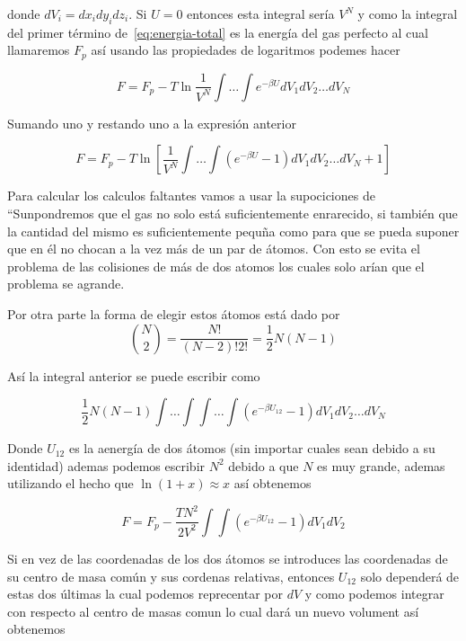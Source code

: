 donde $dV_i = dx_i dy_i dz_i$. Si $U = 0$ entonces esta integral sería
$V^N$ y como la integral del primer término de~\ref{eq:energia-total}
es la energía del gas perfecto al cual llamaremos $F_p$ así
usando las propiedades de logaritmos podemes hacer

\begin{equation}
    F = F_p - T \ln \frac{1}{V^N} \int\ldots\int e^{-\beta U} dV_1dV_2 \ldots dV_N
\end{equation}

Sumando uno y restando uno a la expresión anterior

\begin{equation}
    F = F_p - T \ln  \left[\frac{1}{V^N} \int\ldots\int \left(e^{-\beta U}  - 1\right)dV_1dV_2 \ldots dV_N + 1\right]
\end{equation}

Para calcular los calculos faltantes vamos a usar la supociciones de
\parencite[p.~262]{landau} ``Sunpondremos que el gas no solo está suficientemente
enrarecido, si también que la cantidad del mismo es suficientemente pequña 
como para que se pueda suponer que en él no chocan a la vez más de un par de átomos.
Con esto se evita el problema de las colisiones de más de dos atomos los cuales solo
arían que el problema se agrande.

Por otra  parte la forma de elegir estos átomos está dado por
\begin{equation}
    \binom{N}{2} = \frac{N!}{(N - 2)! 2!} = \frac{1}{2}N(N - 1)
\end{equation}

Así la integral anterior se puede escribir como

\begin{equation}
    \frac{1}{2}N(N - 1)
    \int\ldots\int \int\ldots\int \left(e^{-\beta U_{12}}  - 1\right)dV_1dV_2 \ldots dV_N
\end{equation}

Donde $U_{12}$ es la aenergía de dos átomos (sin importar cuales sean debido
a su identidad) ademas podemos escribir $N^2$ debido a que $N$ es muy grande,
ademas utilizando el hecho que $\ln(1 + x) \approx x$
así obtenemos

\begin{equation}
    F = F_p - \frac{TN^2}{2V^2}\int\int(e^{-\beta U_{12}} - 1) dV_1 dV_2
\end{equation}

Si en vez de las coordenadas de los dos átomos se introduces las coordenadas
de su centro de masa común y sus cordenas relativas, entonces
$U_{12}$ solo dependerá de estas dos últimas la cual podemos reprecentar por
$dV$ y como podemos integrar con respecto al centro de masas comun lo
cual dará un nuevo volument así obtenemos

